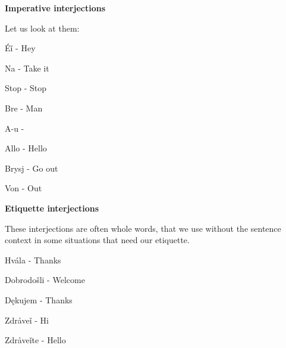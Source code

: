\textbf{Imperative interjections}

Let us look at them:

Éǐ - Hey

Na - Take it

Stop - Stop

Bre - Man

A-u - 

Allo - Hello

Brysj - Go out

Von - Out

\textbf{Etiquette interjections}

These interjections are often whole words, that we use without the sentence context in some situations that need our etiquette.

Hvála - Thanks

Dobrodošli - Welcome

Dękujem - Thanks

Zdråveǐ - Hi

Zdråveǐte - Hello
